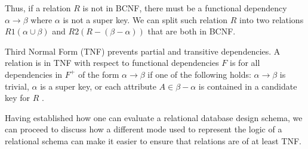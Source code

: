 Thus, if a relation $R$ is not in BCNF, there must be a functional dependency $\alpha \rightarrow \beta$ where $\alpha$ is not a super key. 
We can split such relation $R$ into two relations $R1(\alpha \cup \beta)$ and $R2(R-(\beta-\alpha))$ that are both in BCNF.

Third Normal Form (TNF) prevents partial and transitive dependencies\cite{MontayaNormalForms}.
A relation is in TNF with respect to functional dependencies $F$ is for all dependencies in $F^+$ of the form $\alpha \rightarrow \beta$ if one of the following holds: 
$\alpha \rightarrow \beta$ is trivial, $\alpha$ is a super key, or each attribute $A \in \beta-\alpha$ is contained in a candidate key for $R$ \cite{DBSBook}.

Having established how one can evaluate a relational database design schema, we can proceed to discuss how a different mode used to represent the logic of a relational schema can make it easier to ensure that relations are of at least TNF.
